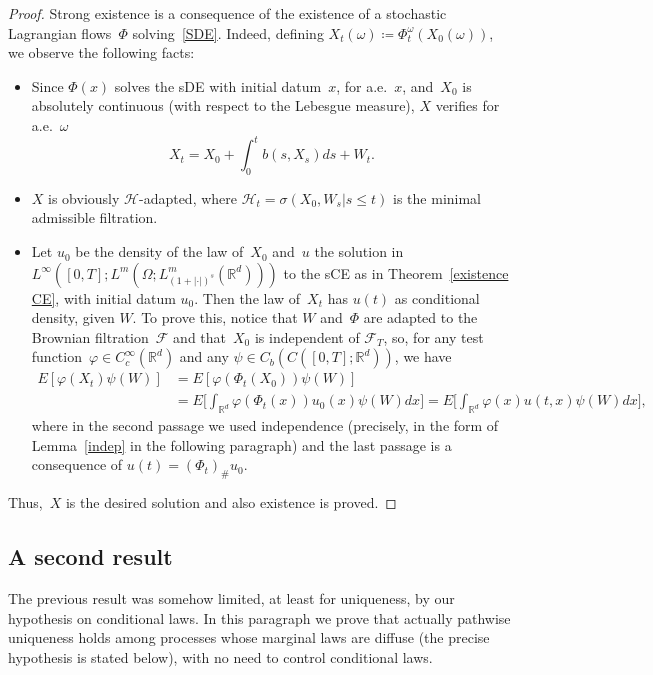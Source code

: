 \documentclass[a4paper,10pt]{article}
\newcommand\1{\mathbbm{1}}
\newcommand{\mr}{\mathbb{R}}
\newcommand{\mc}{\mathcal}
\numberwithin{equation}{section}
\begin{document}
\begin{proof}
Strong existence is a consequence of the existence of a stochastic Lagrangian flows~$\Phi$ solving~\eqref{SDE}. Indeed, defining $X_t(\omega)\coloneqq \Phi_t^\omega(X_0(\omega))$, we observe the following facts: 
\begin{itemize}
\item Since $\Phi(x)$ solves the sDE with initial datum~$x$, for a.e.~$x$, and~$X_0$ is absolutely continuous (with respect to the Lebesgue measure), $X$ verifies for a.e.~$\omega$
\begin{equation*}
X_t=X_0+\int^t_0 b(s,X_s)ds+W_t.
\end{equation*}
\item $X$ is obviously $\mc{H}$-adapted, where $\mc{H}_t=\sigma(X_0,W_s|s\le t)$ is the minimal admissible filtration.
\item Let $u_0$ be the density of the law of~$X_0$ and~$u$ the solution in $L^\infty([0,T];L^m(\Omega;L^m_{(1+|\cdot|)^s}(\mr^d)))$ to the sCE as in Theorem~\ref{existence CE}, with initial datum $u_0$. Then the law of~$X_t$ has $u(t)$ as conditional density, given $W$. To prove this, notice that $W$ and~$\Phi$ are adapted to the Brownian filtration~$\mc{F}$ and that~$X_0$ is independent of $\mc{F}_T$, so, for any test function~$\varphi \in C_c^\infty(\mr^d)$ and any $\psi \in C_b(C([0,T];\mr^d))$, we have\begin{align*}
E[\varphi(X_t)\psi(W)] & =E[\varphi(\Phi_t(X_0))\psi(W)]  \\
  & = E\Big[\int_{\mr^d}\varphi(\Phi_t(x))u_0(x)\psi(W)dx\Big] =E\Big[\int_{\mr^d}\varphi(x)u(t,x)\psi(W)dx\Big],
\end{align*}
where in the second passage we used independence (precisely, in the form of Lemma~\ref{indep} in the following paragraph) and the last passage is a consequence of $u(t)=(\Phi_t)_\#u_0$.
\end{itemize}
Thus,~$X$ is the desired solution and also existence is proved.
\end{proof}


\subsection{A second result}\label{secondpathwise}

The previous result was somehow limited, at least for uniqueness, by our hypothesis on conditional laws. In this paragraph we prove that actually pathwise uniqueness holds among processes whose marginal laws are diffuse (the precise hypothesis is stated below), with no need to control conditional laws.
\end{document}
